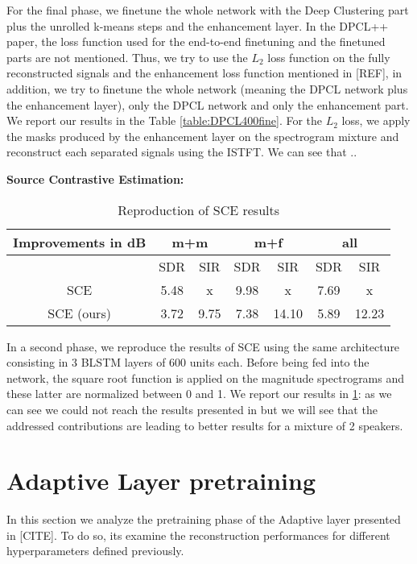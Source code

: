 \documentclass[master,final,11pt]{iscs-thesis}
\begin{document}
For the final phase, we finetune the whole network with the Deep Clustering part plus the unrolled k-means steps and the enhancement layer. In the DPCL++ paper, the loss function used for the end-to-end finetuning and the finetuned parts are not mentioned. Thus, we try to use the $L_2$ loss function on the fully reconstructed signals and the enhancement loss function mentioned in [REF], in addition, we try to finetune the whole network (meaning the DPCL network plus the enhancement layer), only the DPCL network and only the enhancement part. We report our results in the Table \ref{table:DPCL400fine}. For the $L_2$ loss, we apply the masks produced by the enhancement layer on the spectrogram mixture and reconstruct each separated signals using the ISTFT. We can see that ..

\textbf{Source Contrastive Estimation:} 

\begin{table}[ht]
\centering
\begin{tabular}{c|c|c|c|c|c|c}
Improvements in dB & \multicolumn{2}{c|}{m+m} & \multicolumn{2}{c|}{m+f} & \multicolumn{2}{c}{all} \\ 
\hline 
 & SDR & SIR & SDR & SIR & SDR & SIR \\ 
\hline 
SCE \cite{SCE} & 5.48 & x & 9.98 & x & 7.69 & x \\ 
SCE (ours) & 3.72 & 9.75 & 7.38 & 14.10 & 5.89 & 12.23 \\ 
\end{tabular}
\caption{Reproduction of SCE results}
\label{table:SCErepro}
\end{table}

In a second phase, we reproduce the results of SCE \cite{SCE} using the same architecture consisting in 3 BLSTM layers of 600 units each. Before being fed into the network, the square root function is applied on the magnitude spectrograms and these latter are normalized between 0 and 1. We report our results in \ref{table:SCErepro}: as we can see we could not reach the results presented in \cite{SCE} but we will see that the addressed contributions are leading to better results for a mixture of 2 speakers.


\section{Adaptive Layer pretraining}

In this section we analyze the pretraining phase of the Adaptive layer presented in [CITE]. To do so, its examine the reconstruction performances for different hyperparameters defined previously.
\end{document}
